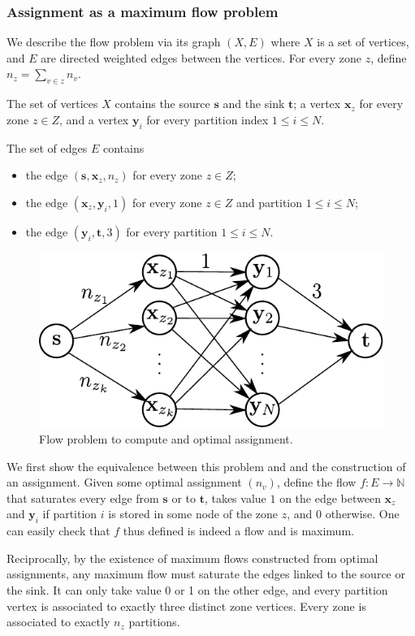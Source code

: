 \documentclass[]{article}
\begin{document}
\subsubsection*{Assignment as a maximum flow problem}

We describe the flow problem via its graph $(X,E)$ where $X$ is a set of vertices, and $E$ are directed weighted edges between the vertices. For every zone $z$, define $n_z=\sum_{v\in z} n_v$.

The set of vertices $X$ contains the source $\mathbf{s}$ and the sink $\mathbf{t}$; a vertex $\mathbf{x}_z$ for every zone $z\in Z$, and a vertex $\mathbf{y}_i$ for every partition index $1\le i\le N$. 

The set of edges $E$ contains
\begin{itemize}
	\item the edge $(\mathbf{s}, \mathbf{x}_z, n_z)$ for every zone $z\in Z$;
	\item the edge $(\mathbf{x}_z, \mathbf{y}_i, 1)$ for every zone $z\in Z$ and partition $1\le i\le N$;
	\item the edge $(\mathbf{y}_i, \mathbf{t}, 3)$ for every partition $1\le i\le N$.
\end{itemize}

\begin{figure}[b]
	\centering
	\includegraphics[width=0.6\linewidth]{figures/flow}
	\caption{Flow problem to compute and optimal assignment.}
\end{figure}

We first show the equivalence between this problem and and the construction of an assignment. Given some optimal assignment $(n_v)$, define the flow $f:E\to \mathbb{N}$ that saturates every edge from $\mathbf{s}$ or to $\mathbf{t}$, takes value $1$ on the edge between $\mathbf{x}_z$ and $\mathbf{y}_i$ if partition $i$ is stored in some node of the zone $z$, and $0$ otherwise. One can easily check that $f$ thus defined is indeed a flow and is maximum.

Reciprocally, by the existence of maximum flows constructed from optimal assignments, any maximum flow must saturate the edges linked to the source or the sink. It can only take value 0 or 1 on the other edge, and every partition vertex is associated to exactly three distinct zone vertices. Every zone is associated to exactly $n_z$ partitions.
\end{document}
